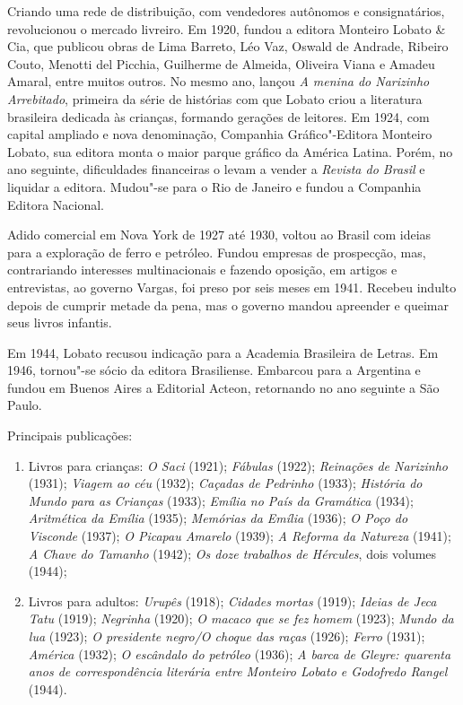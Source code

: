 Criando uma rede de distribuição, com vendedores autônomos e
consignatários, revolucionou o mercado livreiro. Em 1920, fundou a
editora Monteiro Lobato \& Cia, que publicou obras de Lima Barreto, Léo
Vaz, Oswald de Andrade, Ribeiro Couto, Menotti del Picchia, Guilherme de
Almeida, Oliveira Viana e Amadeu Amaral, entre muitos outros. No mesmo
ano, lançou \emph{A menina do Narizinho Arrebitado}, primeira da série
de histórias com que Lobato criou a literatura brasileira dedicada às
crianças, formando gerações de leitores. Em 1924, com capital ampliado e
nova denominação, Companhia Gráfico"-Editora Monteiro Lobato, sua editora
monta o maior parque gráfico da América Latina. Porém, no ano seguinte,
dificuldades financeiras o levam a vender a \emph{Revista do Brasil} e
liquidar a editora. Mudou"-se para o Rio de Janeiro e fundou a Companhia
Editora Nacional.

Adido comercial em Nova York de 1927 até 1930, voltou ao Brasil com
ideias para a exploração de ferro e petróleo. Fundou empresas de
prospecção, mas, contrariando interesses multinacionais e fazendo
oposição, em artigos e entrevistas, ao governo Vargas, foi preso por
seis meses em 1941. Recebeu indulto depois de cumprir metade da pena,
mas o governo mandou apreender e queimar seus livros infantis.

Em 1944, Lobato recusou indicação para a Academia Brasileira de Letras.
Em 1946, tornou"-se sócio da editora Brasiliense. Embarcou para a
Argentina e fundou em Buenos Aires a Editorial Acteon, retornando no ano
seguinte a São Paulo.

Principais publicações:

\begin{enumerate}
\item Livros para crianças: \emph{O Saci} (1921); \emph{Fábulas} (1922);
\emph{Reinações de Narizinho} (1931); \emph{Viagem ao céu} (1932);
\emph{Caçadas de Pedrinho} (1933); \emph{História do Mundo para as}
\emph{Crianças} (1933); \emph{Emília no País da Gramática} (1934);
\emph{Aritmética da Emília} (1935); \emph{Memórias da Emília} (1936);
\emph{O Poço do Visconde} (1937); \emph{O Picapau Amarelo} (1939);
\emph{A Reforma da Natureza} (1941); \emph{A Chave do Tamanho} (1942);
\emph{Os doze trabalhos de Hércules}, dois volumes (1944);

\item Livros para adultos: \emph{Urupês} (1918); \emph{Cidades}
\emph{mortas} (1919); \emph{Ideias de Jeca Tatu} (1919); \emph{Negrinha}
(1920); \emph{O macaco que se fez homem} (1923); \emph{Mundo da lua}
(1923); \emph{O presidente negro/O choque das raças} (1926);
\emph{Ferro} (1931); \emph{América} (1932); \emph{O escândalo do
petróleo} (1936); \emph{A barca de Gleyre: quarenta anos de
correspondência literária entre Monteiro Lobato e Godofredo Rangel}
(1944).
\end{enumerate}

